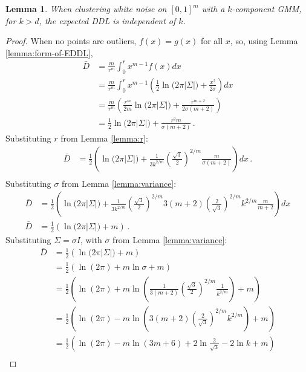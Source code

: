 \documentclass[a4paper,fleqn]{cas-sc}
\newtheorem{lemma}[theorem]{Lemma}
\theoremstyle{remark}
\begin{document}
\begin{lemma} \label{lemma:constant-when-no-outliers}
When clustering white noise on $[0,1]^m$ with a $k$-component GMM, for $k>d$, the expected DDL is independent of $k$. 
\end{lemma}
\begin{proof}
When no points are outliers, $f(x) = g(x)$ for all $x$, so, using Lemma \ref{lemma:form-of-EDDL}, 
\begin{align*}
    \bar{D} &= \frac{m}{r^m}\int_0^r x^{m-1} f(x) dx \\
            &= \frac{m}{r^m}\int_0^r x^{m-1} \left(\frac{1}{2} \ln{(2\pi |\Sigma|}) + \frac{x^2}{2\sigma}\right)  dx \\
            &= \frac{m}{r^m} \left(\frac{r^m}{2m} \ln{(2\pi |\Sigma|}) + \frac{r^{m+2}}{2\sigma(m+2)}\right) \\
            &= \frac{1}{2} \ln{(2\pi |\Sigma|}) + \frac{r^2 m}{\sigma(m+2)} \,.
\end{align*}
Substituting $r$ from Lemma \ref{lemma:r}:
\begin{align*}
    \bar{D} &= \frac{1}{2} \left(\ln{(2\pi |\Sigma|}) + \frac{1}{3k^{2/m}}\left(\frac{\sqrt{3}}{2}\right)^{2/m}\frac{m}{\sigma(m+2)}\right)  dx \,.\\
\end{align*}
Substituting $\sigma$ from Lemma \ref{lemma:variance}:
\begin{align*}
    \bar{D} &= \frac{1}{2} \left(\ln{(2\pi |\Sigma|}) + \frac{1}{3k^{2/m}}\left(\frac{\sqrt{3}}{2}\right)^{2/m}3(m+2)\left(\frac{2}{\sqrt{3}}\right)^{2/m}k^{2/m}\frac{m}{m+2}\right)  dx \\
    \bar{D} &= \frac{1}{2} \left(\ln{(2\pi |\Sigma|}) + m \right) \,.
\end{align*}
Substituting $\Sigma=\sigma I$, with $\sigma$ from Lemma \ref{lemma:variance}:
\begin{align*}
    \bar{D} &= \frac{1}{2} \left(\ln{(2\pi |\Sigma|}) + m \right) \\
            &= \frac{1}{2} \left(\ln{(2\pi)} + m \ln{{\sigma}} + m \right) \\
            &= \frac{1}{2} \left(\ln{(2\pi)} + m \ln{\left(\frac{1}{3(m+2)}\left(\frac{\sqrt{3}}{2}\right)^{2/m}\frac{1}{k^{2/m}}\right)} + m \right) \\
            &= \frac{1}{2} \left(\ln{(2\pi)} - m \ln{\left(3(m+2)\left(\frac{2}{\sqrt{3}}\right)^{2/m}k^{2/m}\right)} + m \right) \\
            &= \frac{1}{2} \left(\ln{(2\pi)} - m \ln{(3m+6)} + 2\ln{\tfrac{2}{\sqrt{3}}} -2\ln{k} + m \right) \\

\end{align*}
\end{proof}
\end{document}
